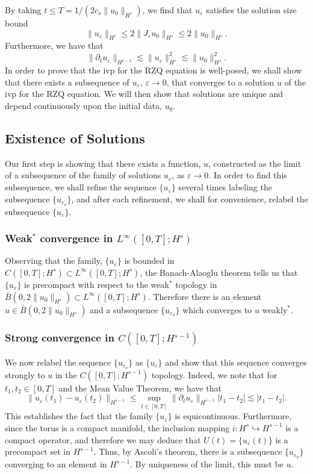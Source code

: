 \documentclass[reqno]{amsart}
\theoremstyle{plain}
\numberwithin{equation}{section}
\newcommand{\p}{\partial}
\newcommand{\ee}{\varepsilon}
\begin{document}
By taking $t \leq T = 1/(2c_s\|u_0\|_{H^s})$, we find that $u_\ee$ satisfies the solution size bound
\begin{equation} \label{soln-bd}
    \|u_\ee\|_{H^s} \leq 2\|J_\ee u_0\|_{H^s} \leq 2\|u_0\|_{H^s}.
\end{equation}
Furthermore, we have that
\begin{equation}
    \|\p_tu_\ee\|_{H^{s-1}} \lesssim \|u_\ee\|_{H^s}^2 \lesssim \|u_0\|_{H^s}^2.
\end{equation}
In order to prove that the ivp for the RZQ equation is well-posed, we shall show that there exists a subsequence of $u_\ee$, $\ee \rightarrow 0$, that converges to a solution $u$ of the ivp for the RZQ equation. We will then show that solutions are unique and depend continuously upon the initial data, $u_0$.

\subsection{Existence of Solutions} Our first step is showing that there exists a function, $u$, constructed as the limit of a subsequence of the family of solutions $u_\ee$, as $\ee \rightarrow 0$. In order to find this subsequence, we shall refine the sequence $\{u_\ee\}$ several times labeling the subsequence $\{u_{\ee_\nu}\}$, and after each refinement, we shall for convenience, relabel the subsequence $\{u_\ee\}$. 

\subsubsection{Weak$^*$ convergence in $L^\infty([0,T]; H^s)$}Observing that the family, $\{u_\ee\}$ is bounded in\\ $C([0, T]; H^s) \subset L^\infty([0, T]; H^s) $, the Banach-Alaoglu theorem tells us that $\{u_\ee\}$  is precompact with respect to the weak$^*$ topology in $\bar{B}(0,2\|u_0\|_{H^s}) \subset L^\infty([0, T]; H^s)$. Therefore there is an element $u \in  \bar{B}(0,2\|u_0\|_{H^s})$ and a subsequence $\{u_{\ee_\nu}\}$ which converges to $u$ weakly$^*$. 

\subsubsection{Strong convergence in $C([0,T]; H^{s-1})$}We now relabel the sequence $\{u_{\ee_\nu}\}$ as $\{u_\ee\}$ and show that this sequence converges strongly to $u$ in the $C([0,T];H^{s-1})$ topology.  Indeed, we note that for $t_1,t_2 \in [0,T]$ and the Mean Value Theorem, we have that
\[
\|u_\ee(t_1)-u_\ee(t_2)\|_{H^{s-1}} \leq \sup_{t\in[0,T]}\|\p_tu_\ee\|_{H^{s-1}}|t_1-t_2| \lesssim |t_1-t_2|.
\]
This establishes the fact that the family $\{u_\ee\}$ is equicontinuous.  Furthermore, since the torus is a compact manifold, the inclusion mapping $i:H^s \hookrightarrow H^{s-1}$ is a compact operator, and therefore we may deduce that $U(t) = \{u_\ee(t)\}$ is a precompact set in $H^{s-1}$.  Thus, by Ascoli's theorem, there is a subsequence $\{u_{\ee_\nu}\}$ converging to an element in $H^{s-1}$.  By uniqueness of the limit, this must be $u$.
\end{document}
